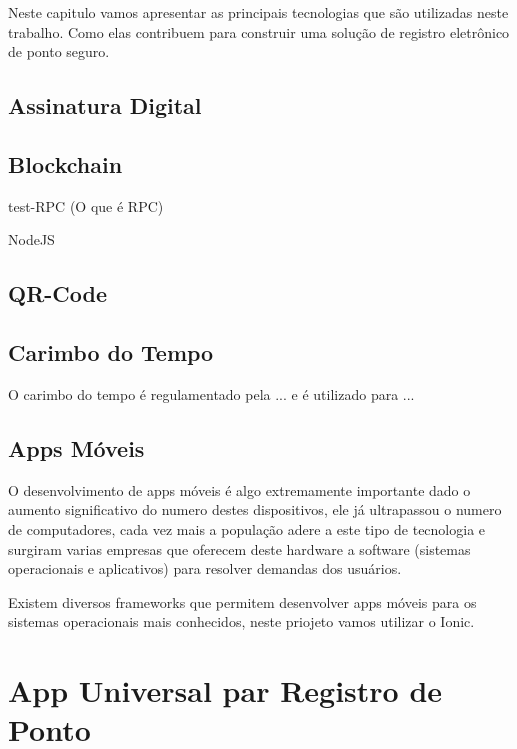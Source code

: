 \documentclass[12pt,openright,twoside,a4paper,english, brazil]{abntex2} %
\begin{document}

Neste capitulo vamos apresentar as principais tecnologias que são utilizadas neste trabalho. Como elas contribuem para construir uma solução de registro eletrônico de ponto seguro.

\section{Assinatura Digital}

\section{Blockchain}

test-RPC (O que é RPC)

NodeJS

\section{QR-Code}

\section{Carimbo do Tempo}

O carimbo do tempo é regulamentado pela ... e é utilizado para ...

\section{Apps Móveis}

O desenvolvimento de apps móveis é algo extremamente importante dado o aumento significativo do numero destes dispositivos, ele já ultrapassou o numero de computadores, cada vez mais a população adere a este tipo de tecnologia e surgiram varias empresas que oferecem deste hardware a software (sistemas operacionais e aplicativos) para resolver demandas dos usuários.

Existem diversos frameworks que permitem desenvolver apps móveis para os sistemas operacionais mais conhecidos, neste priojeto vamos utilizar o Ionic.







\chapter{App Universal par Registro de Ponto}
\end{document}
